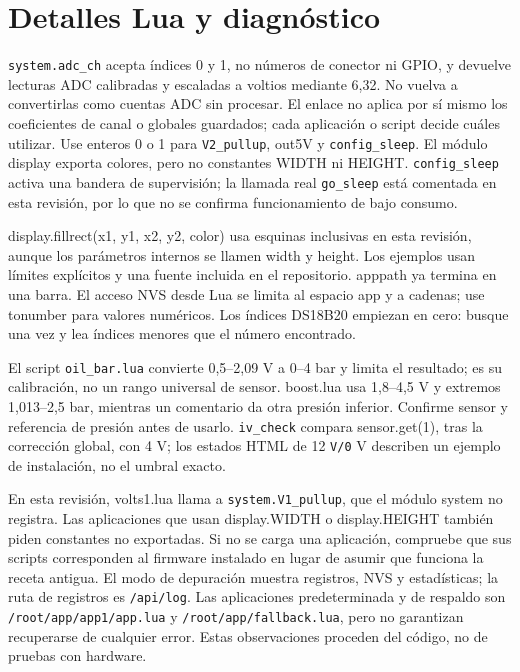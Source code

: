 \section{Detalles Lua y diagnóstico}
\nolinkurl{system.adc_ch} acepta índices 0 y 1, no números de conector ni GPIO, y devuelve lecturas ADC calibradas y escaladas a voltios mediante 6,32. No vuelva a convertirlas como cuentas ADC sin procesar. El enlace no aplica por sí mismo los coeficientes de canal o globales guardados; cada aplicación o script decide cuáles utilizar. Use enteros 0 o 1 para \nolinkurl{V2_pullup}, out5V y \nolinkurl{config_sleep}. El módulo display exporta colores, pero no constantes WIDTH ni HEIGHT. \nolinkurl{config_sleep} activa una bandera de supervisión; la llamada real \nolinkurl{go_sleep} está comentada en esta revisión, por lo que no se confirma funcionamiento de bajo consumo.

display.fillrect(x1, y1, x2, y2, color) usa esquinas inclusivas en esta revisión, aunque los parámetros internos se llamen width y height. Los ejemplos usan límites explícitos y una fuente incluida en el repositorio. apppath ya termina en una barra. El acceso NVS desde Lua se limita al espacio app y a cadenas; use tonumber para valores numéricos. Los índices DS18B20 empiezan en cero: busque una vez y lea índices menores que el número encontrado.

El script \nolinkurl{oil_bar.lua} convierte 0,5–2,09 V a 0–4 bar y limita el resultado; es su calibración, no un rango universal de sensor. boost.lua usa 1,8–4,5 V y extremos 1,013–2,5 bar, mientras un comentario da otra presión inferior. Confirme sensor y referencia de presión antes de usarlo. \nolinkurl{iv_check} compara sensor.get(1), tras la corrección global, con 4 V; los estados HTML de 12 \nolinkurl{V/0} V describen un ejemplo de instalación, no el umbral exacto.

En esta revisión, volts1.lua llama a \nolinkurl{system.V1_pullup}, que el módulo system no registra. Las aplicaciones que usan display.WIDTH o display.HEIGHT también piden constantes no exportadas. Si no se carga una aplicación, compruebe que sus scripts corresponden al firmware instalado en lugar de asumir que funciona la receta antigua. El modo de depuración muestra registros, NVS y estadísticas; la ruta de registros es \nolinkurl{/api/log}. Las aplicaciones predeterminada y de respaldo son \nolinkurl{/root/app/app1/app.lua} y \nolinkurl{/root/app/fallback.lua}, pero no garantizan recuperarse de cualquier error. Estas observaciones proceden del código, no de pruebas con hardware.

